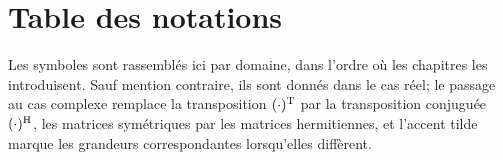 \section*{Table des notations}
\label{sec:commentlire-notations}

Les symboles sont rassemblés ici par domaine, dans l'ordre où les chapitres les
introduisent. Sauf mention contraire, ils sont donnés dans le cas réel; le
passage au cas complexe remplace la transposition $(\cdot)^{\mathrm{T}}$ par la
transposition conjuguée $(\cdot)^{\mathrm{H}}$, les matrices symétriques par les
matrices hermitiennes, et l'accent tilde marque les grandeurs correspondantes
lorsqu'elles diffèrent.

\newcommand{\notatable}[1]{%
  \begingroup
  \small
  \setlength{\LTpre}{0.2\baselineskip}\setlength{\LTpost}{1.0\baselineskip}
  \renewcommand{\arraystretch}{1.15}
  \begin{longtable}{@{}p{0.24\textwidth}p{0.72\textwidth}@{}}
  #1
  \end{longtable}
  \endgroup}

